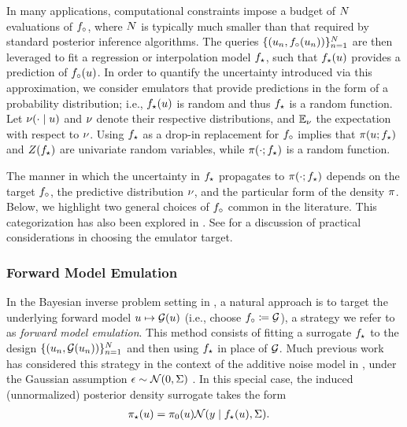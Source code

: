 \documentclass[12pt]{article}
\begin{document}
In many applications, computational constraints impose a budget of 
$N$ evaluations of $f_{\circ}$, where 
$N$ is typically much smaller than that required by standard posterior
inference algorithms. The queries $\{(u_n, f_{\circ}(u_n))\}_{n=1}^{N}$
are then leveraged to fit a regression or interpolation model ${f}_{\star}$,
such that ${f}_{\star}(u)$ provides a prediction of $f_{\circ}(u)$.
In order to quantify the uncertainty introduced via this approximation, we consider 
emulators that provide predictions in the form of a probability distribution; 
i.e., ${f}_{\star}(u)$ is random and thus ${f}_{\star}$ is a random function. 
Let $\nu(\cdot \mid u)$ and $\nu$ denote their respective distributions,
and $\mathbb{E}_{\nu}$ the expectation with respect to $\nu$.
Using ${f}_{\star}$ as a drop-in replacement for 
$f_{\circ}$ implies that $\pi(u; {f}_{\star})$ and $Z({f}_{\star})$
are univariate random variables, while $\pi(\cdot; {f}_{\star})$ 
is a random function.

The manner in which the uncertainty in ${f}_{\star}$ propagates to 
$\pi(\cdot; {f}_{\star})$ depends on the target $f_{\circ}$,
the predictive distribution $\nu$, and the particular form of the 
density $\pi$. Below, we highlight two general choices 
of $f_{\circ}$ common in the literature. This categorization has also 
been explored in \citet{StuartTeck1,StuartTeck2,GP_PDE_priors}. See
\citet{reviewPaper} for a discussion of practical considerations in choosing 
the emulator target. 

\subsubsection{Forward Model Emulation} \label{sec:fwd-em}
In the Bayesian inverse problem setting in ,
a natural approach is to target the underlying forward model 
$u \mapsto \mathcal{G}(u)$ (i.e., choose $f_{\circ} \coloneqq \mathcal{G}$), a strategy 
we refer to as \textit{forward model emulation}.
This method consists of fitting a surrogate ${f}_{\star}$ to the design 
$\{(u_n, \mathcal{G}(u_n))\}_{n=1}^{N}$ and then using ${f}_{\star}$
in place of $\mathcal{G}$. Much previous work has considered this strategy 
in the context of the additive noise model in ,
under the Gaussian assumption $\epsilon \sim \mathcal{N}(0, \Sigma)$
\citep{StuartTeck1,GP_PDE_priors,hydrologicalModel,hydrologicalModel2,
Surer2023sequential,VillaniAdaptiveGP,weightedIVAR,idealizedGCM,CES}.
In this special case, the induced (unnormalized) posterior density surrogate takes the form
\begin{align}
{\pi}_{\star}(u) &= \pi_0(u) \mathcal{N}(y \mid {f}_{\star}(u), \Sigma). \label{eq:post-em-fwd-Gaussian}
\end{align}
\end{document}

